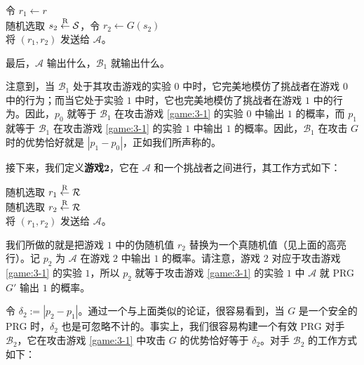 \hspace*{28.5pt} 令 $r_1\leftarrow r$\\
\hspace*{50pt} 随机选取 $s_2\overset{\rm R}\leftarrow\mathcal S$，令 $r_2\leftarrow G(s_2)$\\
\hspace*{50pt} 将 $(r_1,r_2)$ 发送给 $\mathcal A$。

\vspace*{5pt}

\hspace*{5pt} 最后，$\mathcal A$ 输出什么，$\mathcal B_1$ 就输出什么。

\vspace*{10pt}

\noindent
注意到，当 $\mathcal B_1$ 处于其攻击游戏的实验 $0$ 中时，它完美地模仿了挑战者在游戏 $0$ 中的行为；而当它处于实验 $1$ 中时，它也完美地模仿了挑战者在游戏 $1$ 中的行为。因此，$p_0$ 就等于 $\mathcal B_1$ 在攻击游戏 \ref{game:3-1} 的实验 $0$ 中输出 $1$ 的概率，而 $p_1$ 就等于 $\mathcal B_1$ 在攻击游戏 \ref{game:3-1} 的实验 $1$ 中输出 $1$ 的概率。因此，$\mathcal B_1$ 在攻击 $G$ 时的优势恰好就是 $|p_1-p_0|$，正如我们所声称的。

接下来，我们定义\textbf{游戏$\mathbf{2}$}，它在 $\mathcal A$ 和一个挑战者之间进行，其工作方式如下：

\vspace*{10pt}

\hspace*{5pt} 随机选取 $r_1\overset{\rm R}\leftarrow\mathcal R$\\
\hspace*{23pt} \colorbox{gray!50}{随机选取 $r_2\overset{\rm R}\leftarrow\mathcal R$}\\
\hspace*{26pt} 将 $(r_1,r_2)$ 发送给 $\mathcal A$。

\vspace*{10pt}

\noindent
我们所做的就是把游戏 $1$ 中的伪随机值 $r_2$ 替换为一个真随机值（见上面的高亮行）。记 $p_2$ 为 $\mathcal A$ 在游戏 $2$ 中输出 $1$ 的概率。请注意，游戏 $2$ 对应于攻击游戏 \ref{game:3-1} 的实验 $1$，所以 $p_2$ 就等于攻击游戏 \ref{game:3-1} 的实验 $1$ 中 $\mathcal A$ 就 PRG $G'$ 输出 $1$ 的概率。

令 $\delta_2:=|p_2-p_1|$。通过一个与上面类似的论证，很容易看到，当 $G$ 是一个安全的 PRG 时，$\delta_2$ 也是可忽略不计的。事实上，我们很容易构建一个有效 PRG 对手 $\mathcal B_2$，它在攻击游戏 \ref{game:3-1} 中攻击 $G$ 的优势恰好等于 $\delta_2$。对手 $\mathcal B_2$ 的工作方式如下：


